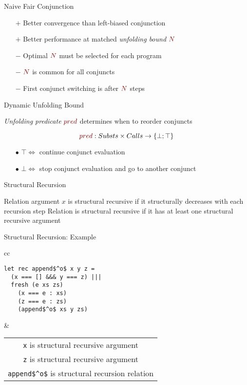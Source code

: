 \documentclass[14pt,aspectratio=169]{beamer}
\let\\\tabularnewline
\let\\\tabularnewline
\newcommand{\set}[1]{\{#1\}}
\theoremstyle{definition}
\begin{document}
\begin{frame}[fragile]{Naive Fair Conjunction}
\begin{itemize}
    \item[$\boldsymbol{+}$] Better convergence than left-biased conjunction
    \vskip3mm
    \item[$\boldsymbol{+}$] Better performance at matched \emph{unfolding bound} $\textcolor{myRed}{N}$
    \vskip3mm
    \item[$\boldsymbol{-}$] Optimal $\textcolor{myRed}{N}$ must be selected for each program
    \vskip3mm
    \item[$\boldsymbol{-}$]  $\textcolor{myRed}{N}$ is common for all conjuncts
    \vskip3mm
    \item[$\boldsymbol{-}$] First conjunct switching is after $\textcolor{myRed}{N}$ steps
\end{itemize}
\end{frame}

\begin{frame}[fragile]{Dynamic Unfolding Bound}
\begin{center}
    \emph{Unfolding predicate} $\textcolor{myRed}{pred}$ determines when to reorder conjuncts
\end{center}
$$\textcolor{myRed}{pred} : Substs \times Calls \rightarrow \set{\bot; \top}$$
\begin{itemize}
    \item[$\bullet$] $\top \Leftrightarrow$ continue conjunct evaluation
    \item[$\bullet$] $\bot \Leftrightarrow$ stop conjunct evaluation and go to another conjunct
\end{itemize}
\end{frame}



\begin{frame}[fragile]{Structural Recursion}
\begin{center}
Relation argument $x$ is structural recursive if it structurally decreases with each recursion step
\vskip1cm
Relation is structural recursive if it has at least one structural recursive argument
\end{center}
\end{frame}

\begin{frame}[fragile]{Structural Recursion: Example}
\begin{tabular}{cc}
\begin{lstlisting}
let rec append$^o$ x y z =
  (x === [] &&& y === z) |||
  fresh (e xs zs)
    (x === e : xs)
    (z === e : zs)
    (append$^o$ xs y zs)
\end{lstlisting} &
\begin{tabular}{c}
\lstinline|x| is structural recursive argument \\[5mm]
\lstinline|z| is structural recursive argument \\[5mm]
\lstinline|append$^o$| is structural recursion relation
\end{tabular}
\end{tabular}
\end{frame}
\end{document}
